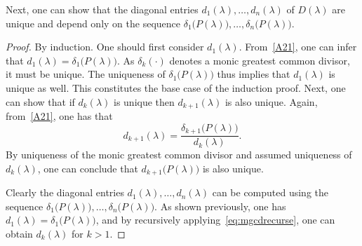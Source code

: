 \documentclass[11pt]{article}
\begin{document}
Next, one can show that the diagonal entries $d_1(\lambda),\dots,d_n(\lambda)$ of $D(\lambda)$ are unique and depend only on the sequence $\delta_1\big(P(\lambda)\big),\dots,\delta_n\big(P(\lambda)\big)$.
\begin{proof}
By induction.
One should first consider $d_1(\lambda)$.
From~\eqref{A21}, one can infer that $d_1(\lambda)=\delta_1\big(P(\lambda)\big)$.
As \(\delta_k(\cdot)\) denotes a monic greatest common divisor, it must be unique.
The uniqueness of $\delta_1\big(P(\lambda)\big)$ thus implies that $d_1(\lambda)$ is unique as well. This constitutes the base case of the induction proof.
Next, one can show that if $d_k(\lambda)$ is unique then $d_{k+1}(\lambda)$ is also unique.
Again, from~\eqref{A21}, one has that
\begin{equation}
\label{eq:mgcdrecurse}
d_{k+1}(\lambda)=\frac{\delta_{k+1}\big(P(\lambda)\big)}{d_k(\lambda)}.
\end{equation}
By uniqueness of the monic greatest common divisor and assumed uniqueness of $d_k(\lambda)$, one can conclude that $d_{k+1}\big(P(\lambda)\big)$ is also unique.

Clearly the diagonal entries $d_1(\lambda),\dots,d_n(\lambda)$ can be computed using the sequence $\delta_1\big(P(\lambda)\big),\dots,\delta_n\big(P(\lambda)\big)$.
As shown previously, one has $d_1(\lambda)=\delta_1\big(P(\lambda)\big)$, and by recursively applying~\eqref{eq:mgcdrecurse}, one can obtain \(d_k(\lambda)\) for \(k > 1\).
\end{proof}
\end{document}
